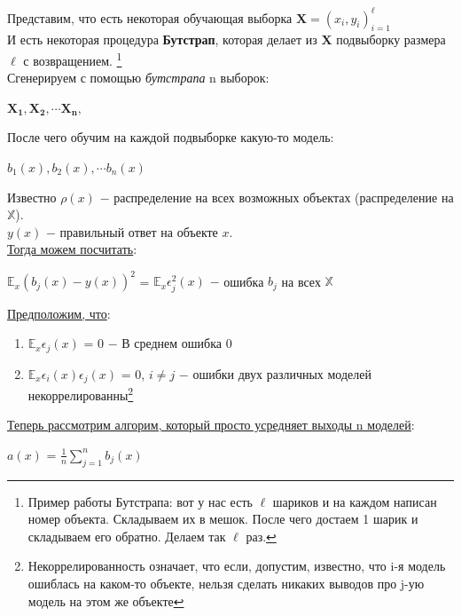         Представим, что есть некоторая обучающая выборка $\mathbf{X} = (x_i, y_i)_{i = 1}^\ell$\\

        И есть некоторая процедура \textbf{Бутстрап}, которая делает из $\mathbf{X}$ подвыборку размера $\ell$ с возвращением. \footnote{Пример работы Бутстрапа: вот у нас есть $\ell$ шариков и на каждом написан номер объекта. Складываем их в мешок. После чего достаем 1 шарик и складываем его обратно. Делаем так $\ell$ раз.}\\

        Сгенерируем с помощью \textit{бутстрапа} n выборок:
        \begin{center}
            $\mathbf{X_1}, \mathbf{X_2}, \cdots \mathbf{X_n},$
        \end{center}
        
        После чего обучим на каждой подвыборке какую-то модель:
        \begin{center}
            $b_1(x), b_2(x), \cdots b_n(x)$
        \end{center}

        Известно $\rho(x)$ $-$ распределение на всех возможных объектах (распределение на $\mathbb{X}$).\\

        $y(x)$ $-$ правильный ответ на объекте $x$.\\

        \underline{Тогда можем посчитать}:
        \begin{center}
            $\mathbb{E}_x(b_j(x) - y(x))^2$ = $\mathbb{E}_x\epsilon_j^2(x)$ $-$ ошибка $b_j$ на всех $\mathbb{X} $
        \end{center}

        \underline{Предположим, что}:
        \begin{enumerate}
            \item  $\mathbb{E}_x\epsilon_j(x)$ = $0$ $-$ В среднем ошибка 0

            \item $\mathbb{E}_x\epsilon_i(x)\epsilon_j(x)$ = $0$, \quad $i \neq j$ $-$ ошибки двух различных моделей некоррелированны\footnote{Некоррелированность означает, что если, допустим, известно, что i-я модель ошиблась на каком-то объекте, нельзя сделать никаких выводов про j-ую модель на этом же объекте}
        \end{enumerate}

        \underline{Теперь рассмотрим алгорим, который просто усредняет выходы n моделей}:
        \begin{center}
            $a(x)$ = $\frac{1}{n}\sum\limits_{j = 1}^nb_j(x)$
        \end{center}

